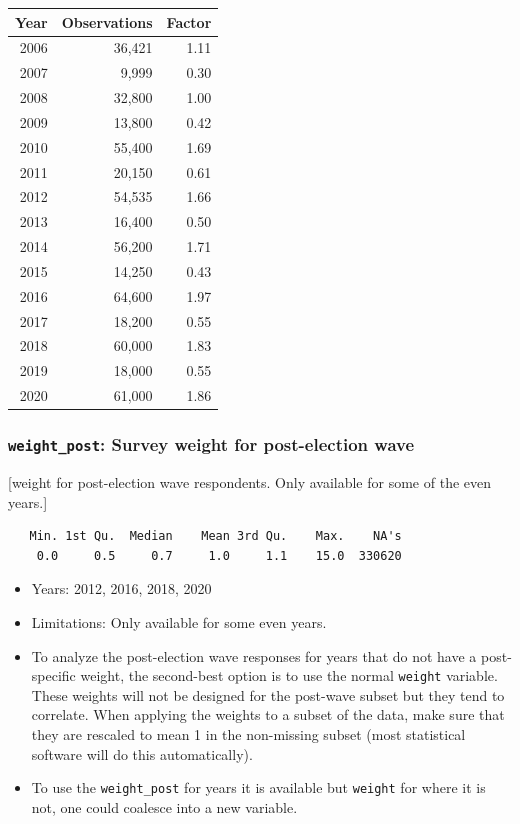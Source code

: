 \documentclass[10pt,article,oneside]{memoir}
\theoremstyle{definition}
\begin{document}
\begin{center}


\begin{tabular}{rrr}
\toprule
Year & Observations & Factor\\
\midrule
2006 & 36,421 & 1.11\\
2007 & 9,999 & 0.30\\
2008 & 32,800 & 1.00\\
2009 & 13,800 & 0.42\\
2010 & 55,400 & 1.69\\
2011 & 20,150 & 0.61\\
2012 & 54,535 & 1.66\\
2013 & 16,400 & 0.50\\
2014 & 56,200 & 1.71\\
2015 & 14,250 & 0.43\\
2016 & 64,600 & 1.97\\
2017 & 18,200 & 0.55\\
2018 & 60,000 & 1.83\\
2019 & 18,000 & 0.55\\
2020 & 61,000 & 1.86\\
\bottomrule
\end{tabular}
\end{center}

\hypertarget{weight_post-survey-weight-for-post-election-wave}{%
\subsubsection{\texorpdfstring{\texttt{weight\_post}: Survey weight for
post-election
wave}{weight\_post: Survey weight for post-election wave}}\label{weight_post-survey-weight-for-post-election-wave}}

{[}weight for post-election wave respondents. Only available for some of
the even years.{]}

\begin{verbatim}
   Min. 1st Qu.  Median    Mean 3rd Qu.    Max.    NA's 
    0.0     0.5     0.7     1.0     1.1    15.0  330620 
\end{verbatim}

\begin{itemize}
\tightlist
\item
  Years: 2012, 2016, 2018, 2020
\item
  Limitations: Only available for some even years.
\item
  To analyze the post-election wave responses for years that do not have
  a post-specific weight, the second-best option is to use the normal
  \texttt{weight} variable. These weights will not be designed for the
  post-wave subset but they tend to correlate. When applying the weights
  to a subset of the data, make sure that they are rescaled to mean 1 in
  the non-missing subset (most statistical software will do this
  automatically).
\item
  To use the \texttt{weight\_post} for years it is available but
  \texttt{weight} for where it is not, one could coalesce into a new
  variable.
\end{itemize}
\end{document}
